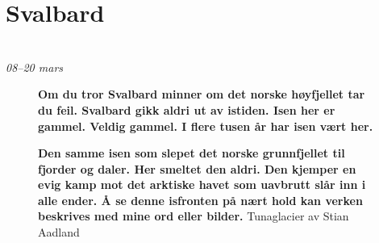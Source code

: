 \chapter{Svalbard}\\ {\footnotesize \textit{08--20 mars}}

\begin{figure}[H]
	\centering
	\vspace{-2cm}
\noindent{}
	\caption*{\textbf{Om du tror Svalbard minner om det norske høyfjellet tar du feil.
Svalbard gikk aldri ut av istiden.
Isen
her er gammel. Veldig gammel. I flere tusen år har isen vært her. }} 

	\label{fig:stianglacier}
\end{figure}


\begin{figure}[H]
	\centering
	\vspace{-2cm}
\noindent{}
	\caption*{\textbf{Den samme isen som
slepet det norske grunnfjellet til fjorder og daler. Her smeltet den
aldri. Den kjemper en evig kamp mot det arktiske havet som uavbrutt slår inn i alle ender. Å se denne isfronten på nært hold kan
verken beskrives med mine ord eller bilder.} Tunaglacier av Stian
Aadland}
\label{fig:venstre}
\end{figure}

